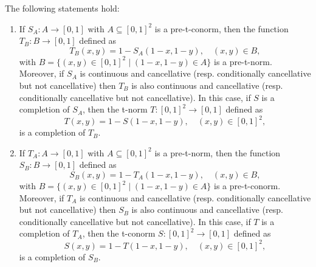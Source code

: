 \begin{proposition}\label{prop:duality:pretnormsconorms} The following statements hold:
	\begin{enumerate}[label=(\roman*)]
		\item If $S_A : A \to [0,1]$ with $A \subseteq [0,1]^2$ is a pre-t-conorm, then the function $T_B:B \to [0,1]$ defined as 
		$$T_B(x,y)=1-S_A(1-x,1-y), \quad (x,y) \in B,$$
		with $B=\{(x,y) \in [0,1]^2 \mid (1-x,1-y) \in A\}$ is a pre-t-norm. Moreover, if $S_A$ is continuous and cancellative (resp. conditionally cancellative but not cancellative) then $T_B$ is also continuous and cancellative (resp. conditionally cancellative but not cancellative). In this case, if $S$ is a completion of $S_A$, then the t-norm $T:[0,1]^2 \to [0,1]$ defined as
		$$T(x,y)=1-S(1-x,1-y), \quad (x,y) \in [0,1]^2,$$
		is a completion of $T_B$.
		\item If $T_A : A \to [0,1]$ with $A \subseteq [0,1]^2$ is a pre-t-norm, then the function $S_B:B \to [0,1]$ defined as 
		$$S_B(x,y)=1-T_A(1-x,1-y), \quad (x,y) \in B,$$
		with $B=\{(x,y) \in [0,1]^2 \mid (1-x,1-y) \in A\}$ is a pre-t-conorm. Moreover, if $T_A$ is continuous and cancellative (resp. conditionally cancellative but not cancellative) then $S_B$ is also continuous and cancellative (resp. conditionally cancellative but not cancellative). In this case, if $T$ is a completion of $T_A$, then the t-conorm $S:[0,1]^2 \to [0,1]$ defined as
		$$S(x,y)=1-T(1-x,1-y), \quad (x,y) \in [0,1]^2,$$
		is a completion of $S_B$.
	\end{enumerate}
\end{proposition}
